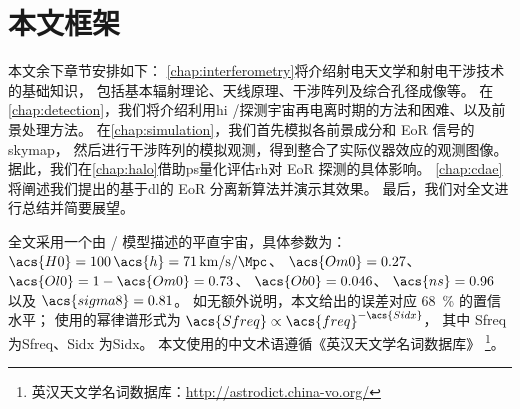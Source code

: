 \section{本文框架}
\label{sec:structure}

本文余下章节安排如下：
\autoref{chap:interferometry}将介绍射电天文学和射电干涉技术的基础知识，
包括基本辐射理论、天线原理、干涉阵列及综合孔径成像等。
在\autoref{chap:detection}，我们将介绍利用\acl{hi}
\hisignal/探测宇宙再电离时期的方法和困难、以及前景处理方法。
在\autoref{chap:simulation}，我们首先模拟各前景成分和 EoR 信号的\acl{skymap}，
然后进行干涉阵列的模拟观测，得到整合了实际仪器效应的观测图像。
据此，我们在\autoref{chap:halo}借助\acl{ps}量化评估\acl{rh}对
EoR 探测的具体影响。
\autoref{chap:cdae}将阐述我们提出的基于\acl{dl}的 EoR 分离新算法并演示其效果。
最后，我们对全文进行总结并简要展望。

全文采用一个由 \lcdm/ 模型描述的平直宇宙，具体参数为：
$\acs{H0} = 100\,\acs{h} = \SI{71}{\km\per\second\per\Mpc}$、
$\acs{Om0} = 0.27$、
$\acs{Ol0} = 1 - \acs{Om0} = 0.73$、
$\acs{Ob0} = 0.046$、
$\acs{ns} = 0.96$ 以及 $\acs{sigma8} = 0.81$。
如无额外说明，本文给出的误差对应 \SI{68}{\percent} 的置信水平；
使用的幂律谱形式为 $\acs{Sfreq} \propto \acs{freq}^{-\acs{Sidx}}$，
其中 \acs{Sfreq} 为\acl{Sfreq}、\acs{Sidx} 为\acl{Sidx}。
本文使用的中文术语遵循《英汉天文学名词数据库》
\footnote{英汉天文学名词数据库：\url{http://astrodict.china-vo.org/}}。



